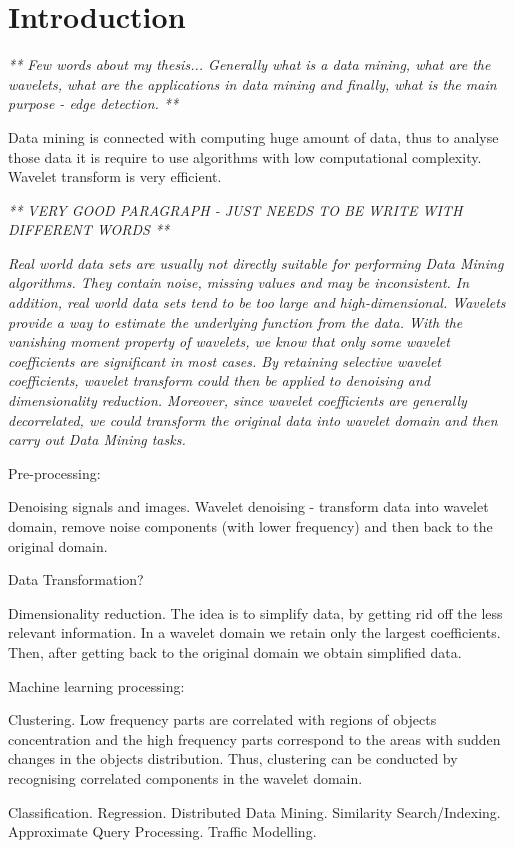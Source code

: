 \chapter*{Introduction}

\textit{ ** Few words about my thesis...
Generally what is a data mining, what are the wavelets, what are the applications in data mining and finally, what is the main purpose - edge detection. **}

Data mining is connected with computing huge amount of data, thus to analyse those data it is require to use algorithms with low computational complexity. Wavelet transform is very efficient.


\textit{ ** VERY GOOD PARAGRAPH - JUST NEEDS TO BE WRITE WITH DIFFERENT WORDS **}
	
\textit{ Real world data sets are usually not directly suitable for performing Data
Mining algorithms. They contain noise, missing values and may be inconsistent.
In addition, real world data sets tend to be too large and high-dimensional.
Wavelets provide a way to estimate the underlying function from the data. With
the vanishing moment property of wavelets, we know that only some wavelet
coefficients are significant in most cases. By retaining selective wavelet coefficients,
wavelet transform could then be applied to denoising and dimensionality
reduction. Moreover, since wavelet coefficients are generally decorrelated,
we could transform the original data into wavelet domain and then carry out
Data Mining tasks.}

Pre-processing:

Denoising signals and images. Wavelet denoising - transform data into wavelet domain, remove noise components (with lower frequency) and then back to the original domain.

Data Transformation?

Dimensionality reduction. The idea is to simplify data, by getting rid off the less relevant information. In a wavelet domain we retain only the largest coefficients. Then, after getting back to the original domain we obtain simplified data.

Machine learning processing:

Clustering. Low frequency parts are correlated with regions of objects concentration and the high frequency parts correspond to the areas with sudden changes in the objects distribution. Thus, clustering can be conducted by recognising correlated components in the wavelet domain.

Classification.
Regression.
Distributed Data Mining.
Similarity Search/Indexing.
Approximate Query Processing.
Traffic Modelling.
